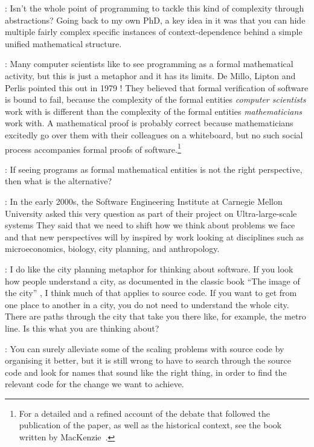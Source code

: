\documentclass[runningheads]{llncs}
\newcommand{\T}{Tomas}
\newcommand{\J}{Joel}
\newcommand{\says}[2][gg]{\vspace{0.5em}\noindent\hangindent=0.5cm{\textsc{#1}}: #2}
\begin{document}
\says[\T]{Isn't the whole point of programming to tackle this kind of complexity through abstractions? Going back to my own PhD, a key idea in it was that you can hide multiple fairly complex specific instances of context-dependence behind a simple unified mathematical structure.}

\says[\J]{Many computer scientists like to see programming as a formal mathematical activity, but this is just a metaphor and it has its limits. De Millo, Lipton and Perlis
pointed this out in 1979 \cite{demillo-1979-proofs}! They believed that formal verification of software is bound to fail, because the complexity of the formal entities \emph{computer scientists} work with is different than the complexity of the formal entities \emph{mathematicians} work with. A mathematical proof is probably correct because mathematicians excitedly go over them with their colleagues on a whiteboard, but no such social process accompanies formal proofs of software.\footnote{For a detailed and a refined account of the debate that followed the publication of the paper, as well as the historical context, see the book written by MacKenzie~\cite{mackenzie-2001-proof}.}}

\says[\T]{If seeing programs as formal mathematical entities is not the right perspective, then what is the alternative?}

\says[\J]{In the early 2000s, the Software Engineering Institute at Carnegie Mellon University asked this very question as part of their project on Ultra-large-scale systems \cite{feiler-2006-ulss} They said that we need to shift how we think about problems we face and that new perspectives will by inspired by work looking at disciplines such as microeconomics, biology, city planning, and anthropology.}

\says[\T]{I do like the city planning metaphor for thinking about software. If you look how people understand a city, as documented in the classic book ``The image of the city'' \cite{lynch-1960-image}, I think much of that applies to source code. If you want to get from one place to another in a city, you do not need to understand the whole city. There are paths through the city that take you there like, for example, the metro line. Is this what you are thinking about?}

\says[\J]{You can surely alleviate some of the scaling problems with source code by organising it better, but it is still wrong to have to search through the source code and look for names that sound like the right thing, in order to find the relevant code for the change we want to achieve.}
\end{document}
